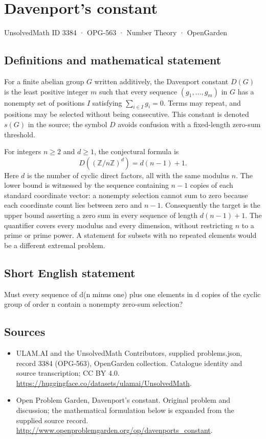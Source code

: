 \documentclass[11pt,a4paper]{article}
\begin{document}
\section*{Davenport's constant}\label{3384}
{\small UnsolvedMath ID 3384 · OPG-563 · Number Theory · OpenGarden}
\subsection{Definitions and mathematical statement}
For a finite abelian group $G$ written additively, the Davenport
constant $D(G)$ is the least positive integer $m$ such that every
sequence $(g_1,\ldots,g_m)$ in $G$ has a nonempty set of positions
$I$ satisfying $\sum_{i\in I}g_i=0$. Terms may repeat, and positions
may be selected without being consecutive. This constant is denoted
$s(G)$ in the source; the symbol $D$ avoids confusion with a
fixed-length zero-sum threshold.

For integers $n\ge2$ and $d\ge1$, the conjectural formula is
\[
              D((\mathbb Z/n\mathbb Z)^d)=d(n-1)+1.
\]
Here $d$ is the number of cyclic direct factors, all with the same
modulus $n$. The lower bound is witnessed by the sequence containing
$n-1$ copies of each standard coordinate vector: a nonempty selection
cannot sum to zero because each coordinate count lies between zero
and $n-1$. Consequently the target is the upper bound asserting a
zero sum in every sequence of length $d(n-1)+1$.
The quantifier covers every modulus and every dimension, without
restricting $n$ to a prime or prime power. A statement for subsets
with no repeated elements would be a different extremal problem.
\subsection{Short English statement}
Must every sequence of d(n minus one) plus one elements in d copies of the cyclic group of order n contain a nonempty zero-sum selection?
\subsection{Sources}
\begin{itemize}
\item[S1] ULAM.AI and the UnsolvedMath Contributors, supplied problems.json, record 3384 (OPG-563), OpenGarden collection. Catalogue identity and source transcription; CC BY 4.0.
\url{https://huggingface.co/datasets/ulamai/UnsolvedMath}.
\item[S2] Open Problem Garden, Davenport's constant. Original problem and discussion; the mathematical formulation below is expanded from the supplied source record.
\url{http://www.openproblemgarden.org/op/davenports_constant}.
\end{itemize}
\end{document}
